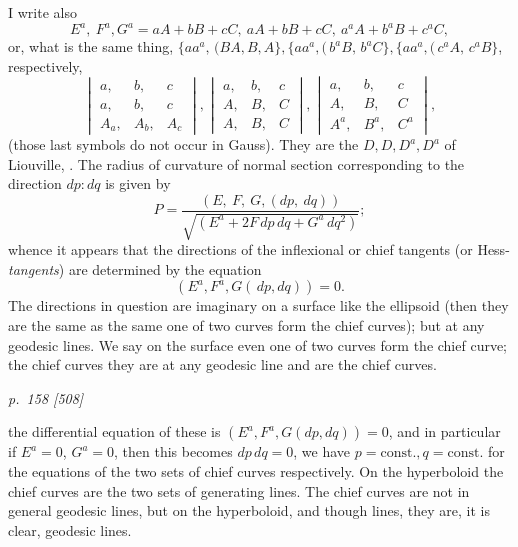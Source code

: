 \documentclass[11pt,a4paper]{book}
\begin{document}
I write also
\[
E^a,\ F^a, G^a = aA + bB + cC,\ aA + bB + cC,\ a^a A + b^a B + c^a C,
\]
or, what is the same thing, $\{aa^a,\,(BA, B, A\}, \{aa^a,(\,b^a B,\,b^a C\}, \{aa^a,(\,c^a A,\,c^a B\}$, respectively,
\[
\begin{vmatrix}
a, & b, & c\\
a, & b, & c\\
A_a, & A_b, & A_c
\end{vmatrix},
\begin{vmatrix}
a, & b, & c\\
A, & B, & C\\
A, & B, & C
\end{vmatrix},
\begin{vmatrix}
a, & b, & c\\
A, & B, & C\\
A^a, & B^a, & C^a
\end{vmatrix},
\]
(those last symbols do not occur in Gauss). They are the $D, D, D^a, D^a$ of Liouville,
. The radius of curvature of normal section corresponding to the direction $dp : dq$ is
given by
\[
P = \frac{(E,\ F,\ G,(dp,\ dq))}{\sqrt{(E^a + 2F\,dp\,dq + G^a\,dq^2)}};
\]
whence it appears that the directions of the inflexional or chief tangents (or Hess-
\textit{tangents}) are determined by the equation
\[
(E^a, F^a, G(\,dp, dq)) = 0.
\]
The directions in question are imaginary on a surface like the ellipsoid (then they
are the same as the same one of two curves form the chief curves); but at any
geodesic lines. We say on the surface even one of two curves form the chief curve;
the chief curves they are at any geodesic line and are the chief curves.

\clearpage

\bigskip
\textit{p.~158 [508]}
\smallskip

\noindent
the differential equation of these is $(E^a, F^a, G(dp, dq)) = 0$, and in particular if
$E^a = 0$, $G^a = 0$, then this becomes $dp\,dq = 0$, we have $p = \mathrm{const.}, q = \mathrm{const.}$ for the
equations of the two sets of chief curves respectively. On the hyperboloid the chief
curves are the two sets of generating lines. The chief curves are not in general
geodesic lines, but on the hyperboloid, and though lines, they are, it is clear, geodesic
lines.
\end{document}

